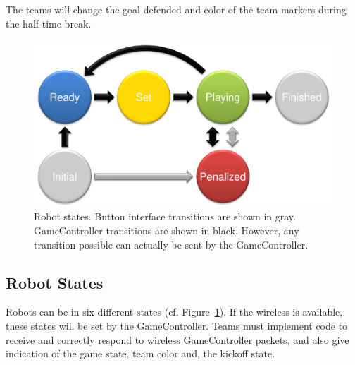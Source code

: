 \documentclass[12pt]{article}
\newcommand{\cf}{\mbox{cf.}\xspace}
\begin{document}
The teams will change the goal defended and color of the team markers during the half-time break.

\begin{figure}[t]
\centerline{\includegraphics[width=0.9\columnwidth]{figs/states.pdf}}
\caption{Robot states. Button interface transitions are shown in gray. GameController transitions are shown in black. However, any transition possible can actually be sent by the GameController.}
\label{fig:robot_states}
\end{figure}

\subsection{Robot States}
\label{sec:robot_states}

Robots can be in six different states (\cf Figure~\ref{fig:robot_states}). If the wireless is available, these states will be set by the GameController. Teams must implement code to receive and correctly respond to wireless GameController packets, and also give indication of the game state, team color and, the kickoff state.
\end{document}
